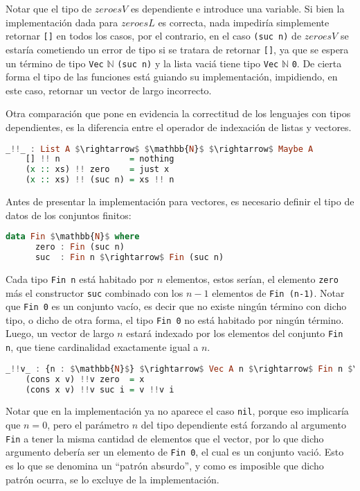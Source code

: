 \documentclass[]{report}
\begin{document}
	Notar que el tipo de $zeroesV$ es dependiente e introduce una variable.
	Si bien la implementación dada para $zeroesL$ es correcta, nada impediría simplemente retornar \verb|[]| en todos los casos, por el contrario, en el caso \verb|(suc n)| de $zeroesV$ se estaría cometiendo un error de tipo si se tratara de retornar \verb|[]|, ya que se espera un término de tipo \verb|Vec| $\mathbb{N}$ \verb|(suc n)| y la lista vaciá tiene tipo \verb|Vec| $\mathbb{N}$ \verb|0|.
	De cierta forma el tipo de las funciones está guiando su implementación, impidiendo, en este caso, retornar un vector de largo incorrecto.
	
	Otra comparación que pone en evidencia la correctitud de los lenguajes con tipos dependientes, es la diferencia entre el operador de indexación de listas y vectores.
	
	\begin{lstlisting}[mathescape, language=Haskell]
	_!!_ : List A $\rightarrow$ $\mathbb{N}$ $\rightarrow$ Maybe A
	[] !! n              = nothing
	(x :: xs) !! zero    = just x
	(x :: xs) !! (suc n) = xs !! n
	\end{lstlisting}
	
	Antes de presentar la implementación para vectores, es necesario definir el tipo de datos de los conjuntos finitos:
	
	\begin{lstlisting}[mathescape, language=Haskell]
	data Fin $\mathbb{N}$ where
	  zero : Fin (suc n)
	  suc  : Fin n $\rightarrow$ Fin (suc n)
	\end{lstlisting}
	
	Cada tipo \verb|Fin n| está habitado por $n$ elementos, estos serían, el elemento \verb|zero| más el constructor \verb|suc| combinado con los $n-1$ elementos de \verb|Fin (n-1)|.
	Notar que \verb|Fin 0| es un conjunto vacío, es decir que no existe ningún término con dicho tipo, o dicho de otra forma, el tipo \verb|Fin 0| no está habitado por ningún término.
	Luego, un vector de largo $n$ estará indexado por los elementos del conjunto \verb|Fin n|, que tiene cardinalidad exactamente igual a $n$.
	
	\begin{lstlisting}[mathescape, language=Haskell]
	_!!v_ : {n : $\mathbb{N}$} $\rightarrow$ Vec A n $\rightarrow$ Fin n $\rightarrow$ A
	(cons x v) !!v zero  = x
	(cons x v) !!v suc i = v !!v i
	\end{lstlisting}
	
	Notar que en la implementación ya no aparece el caso \verb|nil|, porque eso implicaría que $n = 0$, pero el parámetro $n$ del tipo dependiente está forzando al argumento \verb|Fin| a tener la misma cantidad de elementos que el vector, por lo que dicho argumento debería ser un elemento de \verb|Fin 0|, el cual es un conjunto vació.
	Esto es lo que se denomina un ``patrón absurdo'', y como es imposible que dicho patrón ocurra, se lo excluye de la implementación.
	
\end{document}
